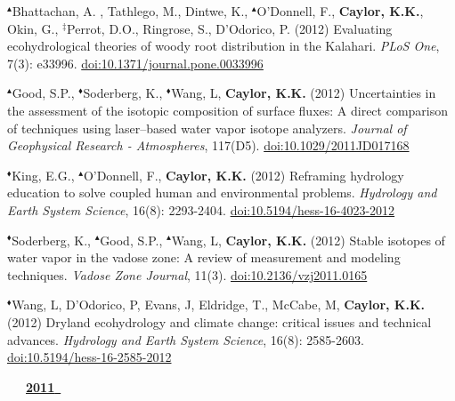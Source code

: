\begin{etaremune}
\item $^{\blacktriangle}$Bhattachan, A. , Tathlego, M., Dintwe, K., $^{\blacktriangle}$O'Donnell, F., \textbf{ Caylor, K.K.}, Okin, G., $^{\ddagger}$Perrot, D.O., Ringrose, S., D'Odorico, P. (2012) Evaluating ecohydrological theories of woody root distribution in the Kalahari. \emph{PLoS One}, 7(3): e33996. \href{https://doi.org/10.1371/journal.pone.0033996}{doi:10.1371/journal.pone.0033996}
\item $^{\blacktriangle}$Good, S.P., $^{\blacklozenge}$Soderberg, K., $^{\blacklozenge}$Wang, L, \textbf{ Caylor, K.K.} (2012) Uncertainties in the assessment of the isotopic composition of surface fluxes: A direct comparison of techniques using laser--based water vapor isotope analyzers. \emph{Journal of Geophysical Research - Atmospheres}, 117(D5). \href{https://doi.org/10.1029/2011JD017168}{doi:10.1029/2011JD017168}
\item $^{\blacklozenge}$King, E.G., $^{\blacktriangle}$O'Donnell, F., \textbf{ Caylor, K.K.} (2012) Reframing hydrology education to solve coupled human and environmental problems. \emph{Hydrology and Earth System Science}, 16(8): 2293-2404. \href{https://doi.org/10.5194/hess-16-4023-2012}{doi:10.5194/hess-16-4023-2012}
\item $^{\blacklozenge}$Soderberg, K., $^{\blacktriangle}$Good, S.P., $^{\blacktriangle}$Wang, L, \textbf{ Caylor, K.K.} (2012) Stable isotopes of water vapor in the vadose zone: A review of measurement and modeling techniques. \emph{Vadose Zone Journal}, 11(3). \href{https://doi.org/10.2136/vzj2011.0165}{doi:10.2136/vzj2011.0165}
\item $^{\blacklozenge}$Wang, L, D'Odorico, P, Evans, J, Eldridge, T., McCabe, M, \textbf{ Caylor, K.K.} (2012) Dryland ecohydrology and climate change: critical issues and technical advances. \emph{Hydrology and Earth System Science}, 16(8): 2585-2603. \href{https://doi.org/10.5194/hess-16-2585-2012}{doi:10.5194/hess-16-2585-2012}

\vspace{0.1in}
\mbox{\ \ \ \underline{\textbf{2011 }}}
\vspace{0.1in}


\end{etaremune}
